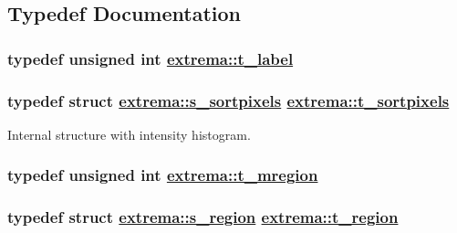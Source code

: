 \subsection{Typedef Documentation}
\hypertarget{namespaceextrema_480109603acd8a50e1dc4e7fa8a08aa6}{
\subsubsection[t\_\-label]{\setlength{\rightskip}{0pt plus 5cm}typedef unsigned int \hyperlink{namespaceextrema_480109603acd8a50e1dc4e7fa8a08aa6}{extrema::t\_\-label}}}
\label{namespaceextrema_480109603acd8a50e1dc4e7fa8a08aa6}


\hypertarget{namespaceextrema_fe82307c3b119c3da09a001341fa3560}{
\subsubsection[t\_\-sortpixels]{\setlength{\rightskip}{0pt plus 5cm}typedef struct \hyperlink{structextrema_1_1s__sortpixels}{extrema::s\_\-sortpixels}  \hyperlink{structextrema_1_1s__sortpixels}{extrema::t\_\-sortpixels}}}
\label{namespaceextrema_fe82307c3b119c3da09a001341fa3560}


Internal structure with intensity histogram. 

\hypertarget{namespaceextrema_478b639d6550cb7f6a38ddebb6be6eef}{
\subsubsection[t\_\-mregion]{\setlength{\rightskip}{0pt plus 5cm}typedef unsigned int \hyperlink{namespaceextrema_478b639d6550cb7f6a38ddebb6be6eef}{extrema::t\_\-mregion}}}
\label{namespaceextrema_478b639d6550cb7f6a38ddebb6be6eef}


\hypertarget{namespaceextrema_69226559b69da898aa092cbdd82db4ac}{
\subsubsection[t\_\-region]{\setlength{\rightskip}{0pt plus 5cm}typedef struct \hyperlink{structextrema_1_1s__region}{extrema::s\_\-region}  \hyperlink{structextrema_1_1s__region}{extrema::t\_\-region}}}
\label{namespaceextrema_69226559b69da898aa092cbdd82db4ac}


